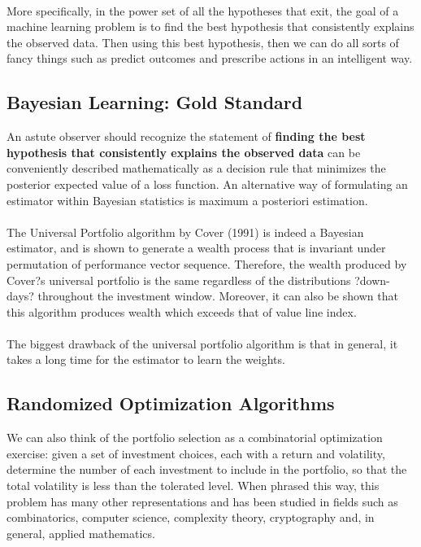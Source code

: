 \documentclass{article}
\begin{document}
\paragraph{}
More specifically, in the power set of all the hypotheses that exit, the goal of a machine learning problem is to find the best hypothesis that consistently explains the observed data. Then using this best hypothesis, then we can do all sorts of fancy things such as predict outcomes and prescribe actions in an intelligent way.


\subsection*{Bayesian Learning: Gold Standard}
An astute observer should recognize the statement of \textbf{finding the best hypothesis that consistently explains the observed data} can be conveniently described mathematically as a decision rule that minimizes the posterior expected value of a loss function. An alternative way of formulating an estimator within Bayesian statistics is maximum a posteriori estimation. 

\paragraph{}
The Universal Portfolio algorithm by Cover (1991) is indeed a Bayesian estimator, and is shown to generate a wealth process that is invariant under permutation of performance vector sequence. Therefore, the wealth produced by Cover?s universal portfolio is the same regardless of the distributions ?down-days? throughout the investment window. Moreover, it can also be shown that this algorithm produces wealth which exceeds that of value line index. 

\paragraph{}
The biggest drawback of the universal portfolio algorithm is that in general, it takes a long time for the estimator to learn the weights. 

\subsection*{Randomized Optimization Algorithms}
We can also think of the portfolio selection as a combinatorial optimization exercise: given a set of investment choices, each with a return and volatility, determine the number of each investment to include in the portfolio, so that the total volatility is less than the tolerated level. When phrased this way, this problem has many other representations and has been studied in fields such as combinatorics, computer science, complexity theory, cryptography and, in general, applied mathematics. 
\end{document}
